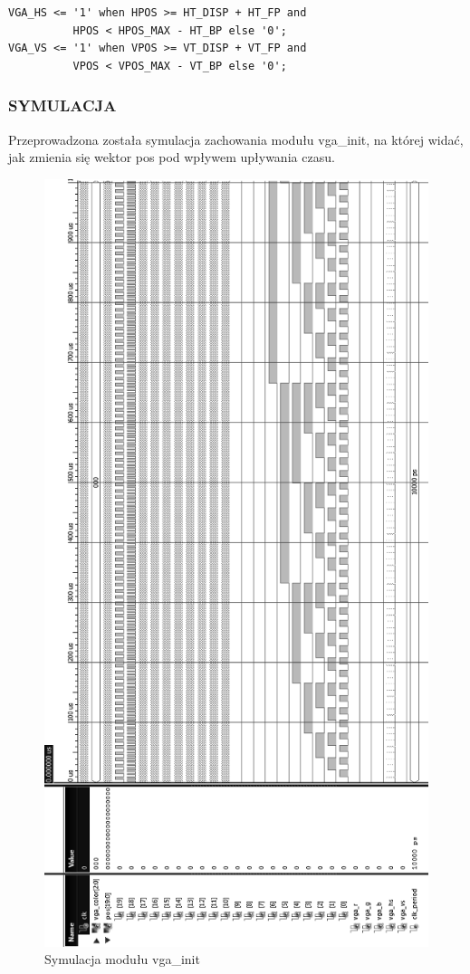 \documentclass[11pt]{article}
\begin{document}
\begin{lstlisting}[caption=Sterowanie pozycją piksela]
VGA_HS <= '1' when HPOS >= HT_DISP + HT_FP and
          HPOS < HPOS_MAX - HT_BP else '0';
VGA_VS <= '1' when VPOS >= VT_DISP + VT_FP and
          VPOS < VPOS_MAX - VT_BP else '0';
\end{lstlisting}

\subsubsection{SYMULACJA}

Przeprowadzona została symulacja zachowania modułu vga\_init, na której widać, jak zmienia się wektor pos pod wpływem upływania czasu.

\begin{figure}[H]
\center
\includegraphics[scale=.6]{symulacja_vga.png}
\caption{Symulacja modułu vga\_init}
\end{figure}
\end{document}
